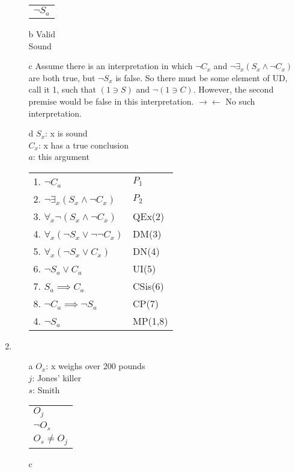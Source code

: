 \documentclass{article}
\begin{document}
\begin{enumerate}
\begin{enumerate}
\begin{tabular}{l}
						$\lnot S_a$\\
					\end{tabular}
				\item[b]
					Valid\\
					Sound
				\item[c]
					Assume there is an interpretation in which $\lnot C_x$ and $\lnot \exists _x (S_x \land \lnot C_x)$ are both true, but $\lnot S_x$ is false. So there must be some element of UD, call it 1, such that $(1 \ni S)$ and $\lnot (1 \ni C)$. However, the second premise would be false in this interpretation. $\rightarrow \leftarrow$ No such interpretation.
				\item[d]
					$S_x$: x is sound\\
					$C_x$: x has a true conclusion\\
					$a$: this argument\\
					\begin{tabular}{l l}
						1. $\lnot C_a$ & $P_1$\\
						2. $\lnot \exists _x (S_x \land \lnot C_x)$ & $P_2$\\
						3. $\forall _x \lnot (S_x \land \lnot C_x)$ & QEx(2)\\
						4. $\forall _x (\lnot S_x \lor \lnot \lnot C_x)$ & DM(3)\\
						5. $\forall _x (\lnot S_x \lor C_x)$ & DN(4)\\
						6. $\lnot S_a \lor C_a$ & UI(5)\\
						7. $S_a \implies C_a$ & CSis(6)\\
						8. $\lnot C_a \implies \lnot S_a$ & CP(7)\\
						4. $\lnot S_a$ & MP(1,8)\\
					\end{tabular}
			\end{enumerate}
		\item
			\begin{enumerate}
				\item[a]
					$O_x$: x weighs over 200 pounds\\
					$j$: Jones' killer\\
					$s$: Smith\\
					\begin{tabular}{l}
						$O_j$\\
						$\lnot O_s$\\ \hline
						$O_s \neq O_j$\\
					\end{tabular}
				\item[c]

\end{enumerate}
\end{enumerate}
\end{document}
